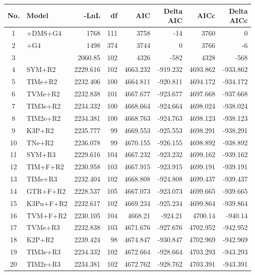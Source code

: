 \documentclass[12pt]{article}
\begin{document}
  \singlespacing
\begin{longtable}{clrrrrrr}

	No. & Model & -LnL & df & AIC & Delta AIC & AICc & Delta AICc \\ \hline
	1 & \selac+DMS+G4 & 1768 & 111 & 3758 & -14 & 3760 & 0 \\ 
	2 & \selac+G4 & 1498 & 374 & 3744 & 0 & 3766 & -6 \\ 
	3 & \phydms & 2060.85 & 102 & 4326 & -582 & 4328 & -568 \\ 
	4 & SYM+R2 & 2229.616 & 102 & 4663.232 & -919.232 & 4693.862 & -933.862 \\ 
	5 & TIMe+R2 & 2232.406 & 100 & 4664.811 & -920.811 & 4694.172 & -934.172 \\ 
	6 & TVMe+R2 & 2232.838 & 101 & 4667.677 & -923.677 & 4697.668 & -937.668 \\ 
	7 & TIM3e+R2 & 2234.332 & 100 & 4668.664 & -924.664 & 4698.024 & -938.024 \\ 
	8 & TIM2e+R2 & 2234.381 & 100 & 4668.763 & -924.763 & 4698.123 & -938.123 \\ 
	9 & K3P+R2 & 2235.777 & 99 & 4669.553 & -925.553 & 4698.291 & -938.291 \\ 
	10 & TNe+R2 & 2236.078 & 99 & 4670.155 & -926.155 & 4698.892 & -938.892 \\ 
	11 & SYM+R3 & 2229.616 & 104 & 4667.232 & -923.232 & 4699.162 & -939.162 \\ 
	12 & TIM+F+R2 & 2230.958 & 103 & 4667.915 & -923.915 & 4699.191 & -939.191 \\ 
	13 & TIMe+R3 & 2232.404 & 102 & 4668.808 & -924.808 & 4699.437 & -939.437 \\ 
	14 & GTR+F+R2 & 2228.537 & 105 & 4667.073 & -923.073 & 4699.665 & -939.665 \\ 
	15 & K3Pu+F+R2 & 2232.617 & 102 & 4669.234 & -925.234 & 4699.864 & -939.864 \\ 
	16 & TVM+F+R2 & 2230.105 & 104 & 4668.21 & -924.21 & 4700.14 & -940.14 \\ 
	17 & TVMe+R3 & 2232.838 & 103 & 4671.676 & -927.676 & 4702.952 & -942.952 \\ 
	18 & K2P+R2 & 2239.424 & 98 & 4674.847 & -930.847 & 4702.969 & -942.969 \\ 
	19 & TIM3e+R3 & 2234.332 & 102 & 4672.664 & -928.664 & 4703.293 & -943.293 \\ 
	20 & TIM2e+R3 & 2234.381 & 102 & 4672.762 & -928.762 & 4703.391 & -943.391 \\ 

\end{longtable}
\end{document}
